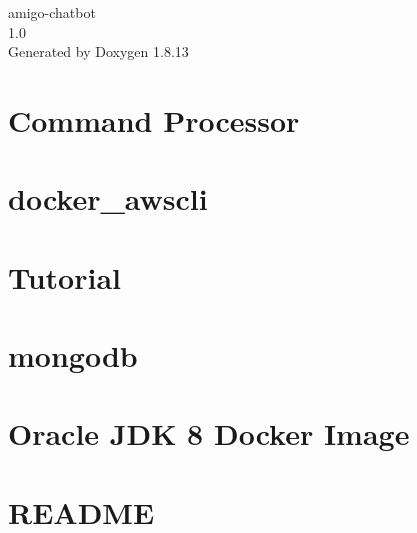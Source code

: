 \documentclass[twoside]{book}
\newcommand{\+}{\discretionary{\mbox{\scriptsize$\hookleftarrow$}}{}{}}
\newcommand{\clearemptydoublepage}{%
  \newpage{\pagestyle{empty}\cleardoublepage}%
}
\begin{document}
\hypersetup{pageanchor=false,
             bookmarksnumbered=true,
             pdfencoding=unicode
            }
\begin{titlepage}
\vspace*{7cm}
\begin{center}%
{\Large amigo-\/chatbot \\[1ex]\large 1.\+0 }\\
\vspace*{1cm}
{\large Generated by Doxygen 1.8.13}\\
\end{center}
\end{titlepage}
\clearemptydoublepage
{}
\tableofcontents
\clearemptydoublepage
{}
\hypersetup{pageanchor=true}

\chapter{Command Processor}
\label{md_command-processor-service__r_e_a_d_m_e}

\chapter{docker\+\_\+awscli}
\label{md_docker-images_aws__r_e_a_d_m_e}

\chapter{Tutorial}
\label{md_docker-images_kafka__r_e_a_d_m_e}

\chapter{mongodb}
\label{md_docker-images_mongodb__r_e_a_d_m_e}

\chapter{Oracle J\+DK 8 Docker Image}
\label{md_docker-images_oracle-jdk__r_e_a_d_m_e}

\chapter{R\+E\+A\+D\+ME}
\label{md__r_e_a_d_m_e}

\end{document}

